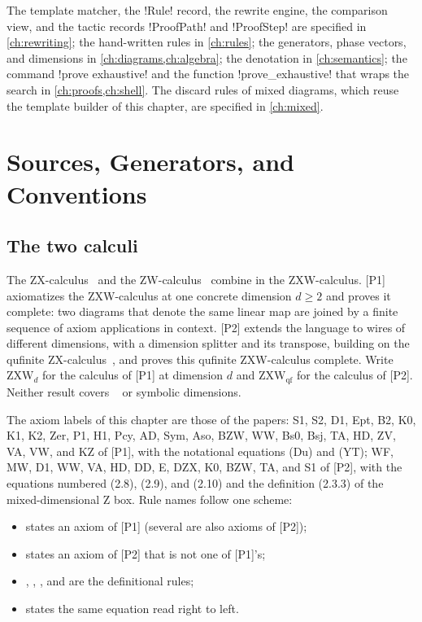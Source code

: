 The template matcher, the \py!Rule! record, the rewrite engine, the comparison view, and the
tactic records \py!ProofPath! and \py!ProofStep! are specified in \cref{ch:rewriting}; the
hand-written rules in \cref{ch:rules}; the generators, phase vectors, and dimensions in
\cref{ch:diagrams,ch:algebra}; the denotation in \cref{ch:semantics}; the command
\azx!prove exhaustive! and the function \py!prove_exhaustive! that wraps the search in
\cref{ch:proofs,ch:shell}. The discard rules of mixed diagrams, which reuse the template builder of
this chapter, are specified in \cref{ch:mixed}.

\section{Sources, Generators, and Conventions}\label{sec:completeness-conventions}

\subsection{The two calculi}

The ZX-calculus~\cite{coecke2011interacting,vandewetering2020working} and the ZW-calculus~\cite{hadzihasanovic2015zw}
combine in the ZXW-calculus. [P1] axiomatizes the ZXW-calculus at one concrete dimension
$d\ge 2$ and proves it complete: two diagrams that denote the same linear map are joined by a
finite sequence of axiom applications in context. [P2] extends the language to wires of
different dimensions, with a dimension splitter and its transpose, building on the qufinite
ZX-calculus~\cite{wang2021qufinite}, and proves this qufinite ZXW-calculus complete. Write
$\mathrm{ZXW}_d$ for the calculus of [P1] at dimension $d$ and $\mathrm{ZXW}_{\mathrm{qf}}$ for the
calculus of [P2]. Neither result covers \bboxes{}~\cite{carette2022bangboxes} or symbolic
dimensions.

The axiom labels of this chapter are those of the papers: S1, S2, D1, Ept, B2, K0, K1, K2, Zer,
P1, H1, Pcy, AD, Sym, Aso, BZW, WW, Bs0, Bsj, TA, HD, ZV, VA, VW, and KZ of [P1], with the
notational equations (Du) and (YT); WF, MW, D1, WW, VA, HD, DD, E, DZX, K0, BZW, TA, and S1 of
[P2], with the equations numbered (2.8), (2.9), and (2.10) and the definition (2.3.3) of the
mixed-dimensional Z box. Rule names follow one scheme:
\begin{itemize}
\item {} states an axiom of [P1] (several are also axioms of [P2]);
\item {} states an axiom of [P2] that is not one of [P1]'s;
\item {}, , , and
   are the definitional rules;
\item {} states the same equation read right to left.
\end{itemize}

